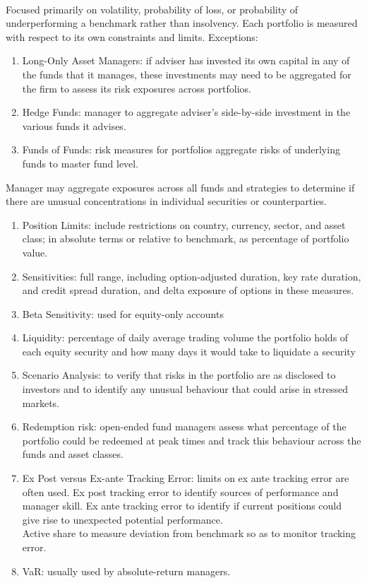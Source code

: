 \begin{remark} \\
Focused primarily on volatility, probability of loss, or probability of underperforming a benchmark rather than insolvency. Each portfolio is measured with respect to its own constraints and limits. Exceptions:
\begin{enumerate}[label=\roman*.]
\setlength{\itemsep}{0pt}
\item Long-Only Asset Managers: if adviser has invested its own capital in any of the funds that it manages, these investments may need to be aggregated for the firm to assess its risk exposures across portfolios.
\item Hedge Funds: manager to aggregate adviser’s side-by-side investment in the various funds it advises.
\item Funds of Funds: risk measures for portfolios aggregate risks of underlying funds to master fund level.
\end{enumerate}
Manager may aggregate exposures across all funds and strategies to determine if there are unusual concentrations in individual securities or counterparties.
\end{remark}

\begin{remark} 
\begin{enumerate}[label=\roman*.]
\setlength{\itemsep}{0pt}
\item Position Limits: include restrictions on country, currency, sector, and asset class; in absolute terms or relative to benchmark, as percentage of portfolio value.
\item Sensitivities: full range, including option-adjusted duration, key rate duration, and credit spread duration, and delta exposure of options in these measures. 
\item Beta Sensitivity: used for equity-only accounts
\item Liquidity: percentage of daily average trading volume the portfolio holds of each equity security and how many days it would take to liquidate a security 
\item Scenario Analysis: to verify that risks in the portfolio are as disclosed to investors and to identify any unusual behaviour that could arise in stressed markets.
\item Redemption risk: open-ended fund managers assess what percentage of the portfolio could be redeemed at peak times and track this behaviour across the funds and asset classes.
\item Ex Post versus Ex-ante Tracking Error: limits on ex ante tracking error are often used. Ex post tracking error to identify sources of performance and manager skill. Ex ante tracking error to identify if current positions could give rise to unexpected potential performance.\\
Active share to measure deviation from benchmark so as to monitor tracking error.
\item VaR: usually used by absolute-return managers.
\end{enumerate}
\end{remark}

